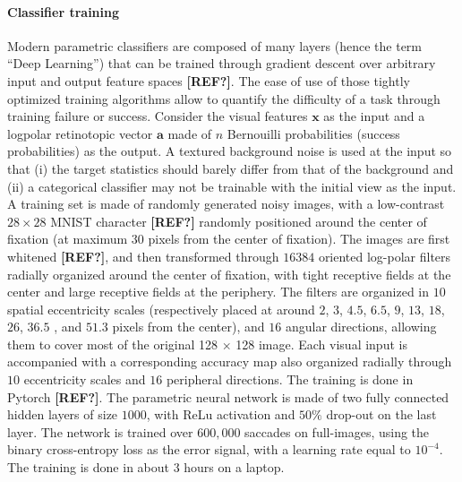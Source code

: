 \paragraph{Classifier training}
Modern parametric classifiers are composed of many layers (hence the term ``Deep Learning'') that can be trained through gradient descent over arbitrary input and output feature spaces  {\bf [REF?]}. The ease of use of those tightly optimized training algorithms allow to quantify the difficulty of a task through training failure or success. Consider the visual features  $\boldsymbol{x}$ as the input and a logpolar retinotopic vector $\boldsymbol{a}$ made of $n$ Bernouilli probabilities (success probabilities) as the output. A textured background noise is used at the input so that (i) the target statistics should barely differ from that of the background and (ii) a  categorical classifier may not be trainable with the initial view as the input. A training set is made of randomly generated noisy images, with a low-contrast $28\times 28$ MNIST character   {\bf [REF?]} randomly positioned around the center of fixation (at maximum $30$ pixels from the center of fixation). The images are first whitened  {\bf [REF?]}, and then transformed through $16384$ oriented log-polar filters radially organized around the center of fixation, with tight receptive fields at the center and large receptive fields at the periphery. The filters are organized in $10$ spatial eccentricity scales (respectively placed at around $2$, $3$, $4.5$, $6.5$, $9$, $13$, $18$, $26$, $36.5$ , and $51.3$ pixels from the center), and $16$ angular directions, allowing them to cover most of the original 128 $\times$ 128 image. Each visual input is accompanied with a corresponding accuracy map also organized radially through $10$ eccentricity scales and $16$ peripheral directions. The training is done in Pytorch  {\bf [REF?]}. The parametric neural network is made of two fully connected hidden layers of size $1000$, with ReLu activation and $50 \%$ drop-out on the last layer. The network is trained over $600,000$ saccades on full-images, using the binary cross-entropy loss as the error signal, with a learning rate equal to $10^{-4}$. The training is done in about 3 hours on a laptop.


